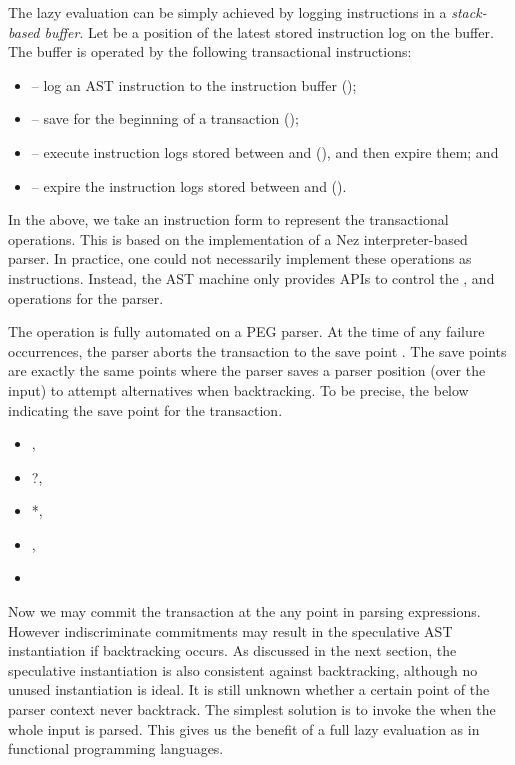 \documentclass[JIP]{ipsj}
\begin{document}
The lazy evaluation can be simply achieved by logging instructions in a {\em stack-based buffer}. Let  be a position of the latest stored instruction log on the buffer. The buffer is operated by the following transactional instructions:

\begin{itemize}
\item {}  -- log an AST instruction to the instruction buffer ();
\item  -- save  for the beginning of a transaction ();
\item  -- execute instruction logs stored between  and  (), and then expire them; and 
\item  -- expire the instruction logs stored between  and  ().
\end{itemize}

In the above, we take an instruction form to represent the transactional operations. This is based on the implementation of a Nez interpreter-based parser. In practice, one could not necessarily implement these operations as instructions. Instead, the AST machine only provides APIs to control the ,  and  operations for the parser. 

The  operation is fully automated on a PEG parser.  At the time of any failure occurrences, the parser aborts the transaction to the save point . The save points are exactly the same points where the parser saves a parser position (over the input) to attempt alternatives when backtracking. To be precise, the  below indicating the save point for the transaction.

\begin{itemize}
\item ,
\item ?,
\item *,
\item ,
\item 
\end{itemize}

Now we may commit the transaction at the any point in parsing expressions. However indiscriminate commitments may result in the speculative AST instantiation if backtracking occurs. As discussed in the next section, the speculative instantiation is also consistent against backtracking, although no unused instantiation is ideal. It is still unknown whether a certain point of the parser context never backtrack. The simplest solution is to invoke the  when the whole input is parsed. This gives us the benefit of a full lazy evaluation as in functional programming languages.  
\end{document}
